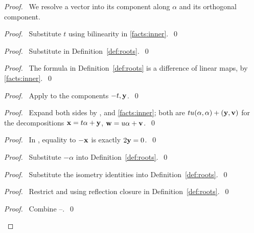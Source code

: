 \begin{proof}
\pfsketch\ We resolve a vector into its component along $\alpha$ and its
orthogonal component.
\begin{proof}\pf\ Substitute $t$ using bilinearity in \ref{facts:inner}.~\qed\end{proof}
\begin{proof}\pf\ Substitute  in Definition~\ref{def:roots}.~\qed\end{proof}
\begin{proof}\pf\ The formula in Definition~\ref{def:roots} is a difference
of linear maps, by \ref{facts:inner}.~\qed\end{proof}
\begin{proof}\pf\ Apply  to the components $-t,{\mathbf y}$.~\qed\end{proof}
\begin{proof}\pf\ Expand both sides by ,
 and \ref{facts:inner}; both are $tu(\alpha,\alpha)+({\mathbf y},{\mathbf v})$
for the decompositions ${\mathbf x}=t\alpha+{\mathbf y}$, ${\mathbf w}=u\alpha+{\mathbf v}$.~\qed\end{proof}
\begin{proof}\pf\ In , equality to $-{\mathbf x}$ is exactly
$2{\mathbf y}=0$.~\qed\end{proof}
\begin{proof}\pf\ Substitute $-\alpha$ into Definition~\ref{def:roots}.~\qed\end{proof}
\begin{proof}\pf\ Substitute the isometry identities into
Definition~\ref{def:roots}.~\qed\end{proof}
\begin{proof}\pf\ Restrict  and 
using reflection closure in Definition~\ref{def:roots}.~\qed\end{proof}
\qedstep
\begin{proof}\pf\ Combine --.~\qed\end{proof}
\end{proof}

